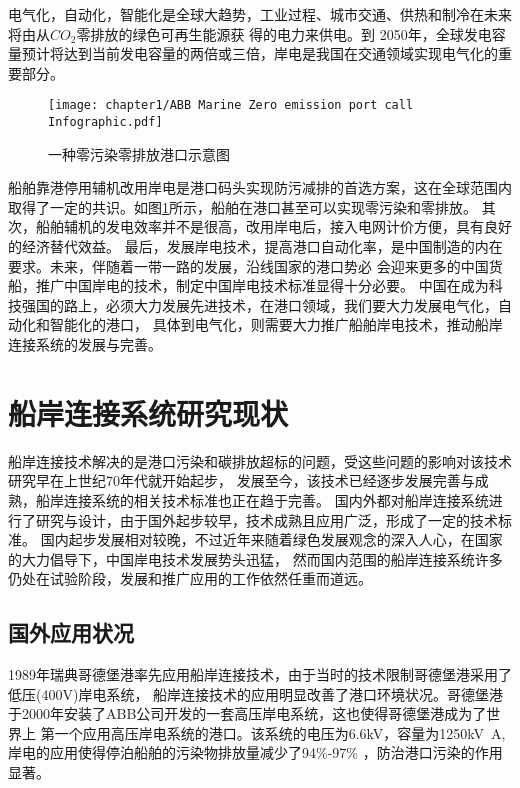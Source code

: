\begin{table}[!htp]
	\centering
	\caption[中国岸电替代辅机发电的减排表现]{中国岸电替代辅机发电的减排表现\cite{SP3}}
	\label{tab:岸电替代效益}
\end{table}

电气化，自动化，智能化是全球大趋势，工业过程、城市交通、供热和制冷在未来将由从$CO_{2}$零排放的绿色可再生能源获
得的电力来供电。到 2050年，全球发电容量预计将达到当前发电容量的两倍或三倍，岸电是我国在交通领域实现电气化的重要部分。

\begin{figure}[!htp]
	\centering
	\texttt{[image: chapter1/ABB Marine Zero emission port call Infographic.pdf]}
	\caption{一种零污染零排放港口示意图}
	\label{fig:一种零污染零排放港口示意图}
\end{figure}

船舶靠港停用辅机改用岸电是港口码头实现防污减排的首选方案，这在全球范围内取得了一定的共识。如图\ref{fig:一种零污染零排放港口示意图}所示，船舶在港口甚至可以实现零污染和零排放。
其次，船舶辅机的发电效率并不是很高，改用岸电后，接入电网计价方便，具有良好的经济替代效益。
最后，发展岸电技术，提高港口自动化率，是中国制造的内在要求。未来，伴随着一带一路的发展，沿线国家的港口势必
会迎来更多的中国货船，推广中国岸电的技术，制定中国岸电技术标准显得十分必要。
中国在成为科技强国的路上，必须大力发展先进技术，在港口领域，我们要大力发展电气化，自动化和智能化的港口，
具体到电气化，则需要大力推广船舶岸电技术，推动船岸连接系统的发展与完善。

\section{船岸连接系统研究现状}
船岸连接技术解决的是港口污染和碳排放超标的问题，受这些问题的影响对该技术研究早在上世纪70年代就开始起步，
发展至今，该技术已经逐步发展完善与成熟，船岸连接系统的相关技术标准也正在趋于完善。
国内外都对船岸连接系统进行了研究与设计，由于国外起步较早，技术成熟且应用广泛，形成了一定的技术标准。
国内起步发展相对较晚，不过近年来随着绿色发展观念的深入人心，在国家的大力倡导下，中国岸电技术发展势头迅猛，
然而国内范围的船岸连接系统许多仍处在试验阶段，发展和推广应用的工作依然任重而道远\cite{SP4}。

\subsection{国外应用状况}
1989年瑞典哥德堡港率先应用船岸连接技术，由于当时的技术限制哥德堡港采用了低压(400V)岸电系统，
船岸连接技术的应用明显改善了港口环境状况。哥德堡港于2000年安装了ABB公司开发的一套高压岸电系统，这也使得哥德堡港成为了世界上
第一个应用高压岸电系统的港口。该系统的电压为6.6kV，容量为1250\si{kV.A},岸电的应用使得停泊船舶的污染物排放量减少了94\%-97\%
\cite{SP4}，防治港口污染的作用显著。

